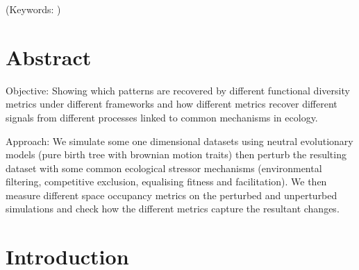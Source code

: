 \documentclass[12pt,letterpaper]{article}
\begin{document}
\noindent (Keywords: )\\

\section{Abstract}
Objective: Showing which patterns are recovered by different functional diversity metrics under different frameworks and how different metrics recover different signals from different processes linked to common mechanisms in ecology.

Approach: We simulate some one dimensional datasets using neutral evolutionary models (pure birth tree with brownian motion traits) then perturb the resulting dataset with some common ecological stressor mechanisms (environmental filtering, competitive exclusion, equalising fitness and facilitation).
We then measure different space occupancy metrics on the perturbed and unperturbed simulations and check how the different metrics capture the resultant changes.

\section{Introduction}
\end{document}

